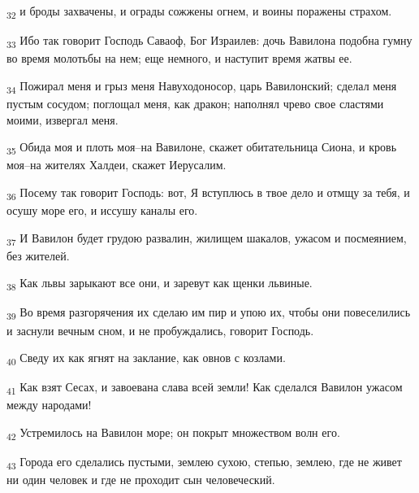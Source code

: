 \begin{tcolorbox}
\textsubscript{32} и броды захвачены, и ограды сожжены огнем, и воины поражены страхом.
\end{tcolorbox}
\begin{tcolorbox}
\textsubscript{33} Ибо так говорит Господь Саваоф, Бог Израилев: дочь Вавилона подобна гумну во время молотьбы на нем; еще немного, и наступит время жатвы ее.
\end{tcolorbox}
\begin{tcolorbox}
\textsubscript{34} Пожирал меня и грыз меня Навуходоносор, царь Вавилонский; сделал меня пустым сосудом; поглощал меня, как дракон; наполнял чрево свое сластями моими, извергал меня.
\end{tcolorbox}
\begin{tcolorbox}
\textsubscript{35} Обида моя и плоть моя--на Вавилоне, скажет обитательница Сиона, и кровь моя--на жителях Халдеи, скажет Иерусалим.
\end{tcolorbox}
\begin{tcolorbox}
\textsubscript{36} Посему так говорит Господь: вот, Я вступлюсь в твое дело и отмщу за тебя, и осушу море его, и иссушу каналы его.
\end{tcolorbox}
\begin{tcolorbox}
\textsubscript{37} И Вавилон будет грудою развалин, жилищем шакалов, ужасом и посмеянием, без жителей.
\end{tcolorbox}
\begin{tcolorbox}
\textsubscript{38} Как львы зарыкают все они, и заревут как щенки львиные.
\end{tcolorbox}
\begin{tcolorbox}
\textsubscript{39} Во время разгорячения их сделаю им пир и упою их, чтобы они повеселились и заснули вечным сном, и не пробуждались, говорит Господь.
\end{tcolorbox}
\begin{tcolorbox}
\textsubscript{40} Сведу их как ягнят на заклание, как овнов с козлами.
\end{tcolorbox}
\begin{tcolorbox}
\textsubscript{41} Как взят Сесах, и завоевана слава всей земли! Как сделался Вавилон ужасом между народами!
\end{tcolorbox}
\begin{tcolorbox}
\textsubscript{42} Устремилось на Вавилон море; он покрыт множеством волн его.
\end{tcolorbox}
\begin{tcolorbox}
\textsubscript{43} Города его сделались пустыми, землею сухою, степью, землею, где не живет ни один человек и где не проходит сын человеческий.
\end{tcolorbox}
